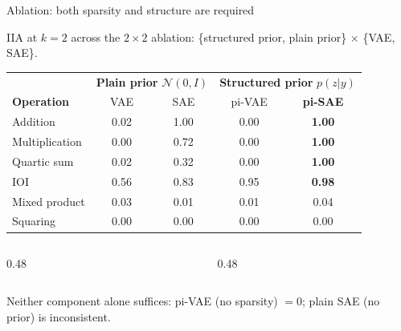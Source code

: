 \documentclass[aspectratio=169,11pt]{beamer}
\begin{document}
\begin{frame}{Ablation: both sparsity and structure are required}
\vspace{-0.2em}
\centering

{\small IIA at $k{=}2$ across the $2 \times 2$ ablation: \{structured prior, plain prior\} $\times$ \{VAE, SAE\}.}

\vspace{0.5em}
{\setlength{\tabcolsep}{4pt}
\begin{tabular}{@{}l|cc|cc@{}}
\toprule
& \multicolumn{2}{c|}{\textbf{Plain prior} $\mathcal{N}(0,I)$} & \multicolumn{2}{c}{\textbf{Structured prior} $p(z|y)$} \\
\textbf{Operation} & VAE & SAE & pi-VAE & \textbf{pi-SAE} \\
\midrule
Addition & 0.02 & \textcolor{always}{1.00} & 0.00 & \textbf{\textcolor{always}{1.00}} \\
Multiplication & 0.00 & 0.72 & 0.00 & \textbf{\textcolor{always}{1.00}} \\
Quartic sum & 0.02 & 0.32 & 0.00 & \textbf{\textcolor{always}{1.00}} \\
IOI & 0.56 & 0.83 & \textcolor{always}{0.95} & \textbf{\textcolor{always}{0.98}} \\
\midrule
Mixed product & 0.03 & 0.01 & 0.01 & 0.04 \\
Squaring & 0.00 & 0.00 & 0.00 & 0.00 \\
\bottomrule
\end{tabular}}

\vspace{0.5em}
\begin{columns}[T]
\begin{column}{0.48\textwidth}
\end{column}
\begin{column}{0.48\textwidth}
\end{column}
\end{columns}

\vspace{0.3em}
\centering
{\small Neither component alone suffices: pi-VAE (no sparsity) $= 0$; plain SAE (no prior) is inconsistent.}
\end{frame}
\end{document}
